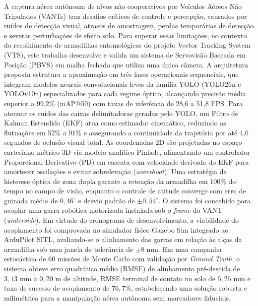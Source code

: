A captura aérea autônoma de alvos não cooperativos por Veículos Aéreos Não Tripulados (VANTs) traz desafios críticos de controle e percepção, causados por ruídos de detecção visual, atrasos de amostragem, perdas temporárias de detecção e severas perturbações de efeito solo. Para superar essas limitações, no contexto do recolhimento de armadilhas entomológicas do projeto Vector Tracking System (VTS), este trabalho desenvolve e valida um sistema de Servovisão Baseada em Posição (PBVS) em malha fechada que utiliza uma única câmera. A arquitetura proposta estrutura a aproximação em três fases operacionais sequenciais, que integram modelos neurais convolucionais leves da família YOLO (YOLO26n e YOLOv10n) especializados para cada regime óptico, alcançando precisão média superior a 99,2\% (mAP@50) com taxas de inferência de 28,6 a 51,8 FPS. Para atenuar os ruídos das caixas delimitadoras geradas pelo YOLO, um Filtro de Kalman Estendido (EKF) atua como estimador cinemático, reduzindo as flutuações em 52\% a 91\% e assegurando a continuidade da trajetória por até 4,0 segundos de oclusão visual total. As coordenadas 2D são projetadas no espaço cartesiano métrico 3D via modelo analítico Pinhole, alimentando um controlador Proporcional-Derivativo (PD) em cascata com velocidade derivada do EKF para amortecer oscilações e evitar sobrelevação (\textit{overshoot}). Uma estratégia de histerese óptica de zona dupla garante a retenção da armadilha em 100\% do tempo no campo de visão, enquanto o controle de atitude converge com erro de guinada médio de $0{,}46^\circ$ e desvio padrão de $\pm 0{,}54^\circ$. O sistema foi concebido para acoplar uma garra robótica motorizada instalada sob o \textit{frame} do VANT (\textit{underside}). Em virtude do cronograma de desenvolvimento, a viabilidade do acoplamento foi comprovada no simulador físico Gazebo Sim integrado ao ArduPilot SITL, avaliando-se o alinhamento das garras em relação às alças da armadilha sob uma janela de tolerância de $\pm 8\text{ mm}$. Em uma campanha estocástica de 60 missões de Monte Carlo com validação por \textit{Ground Truth}, o sistema obteve erro quadrático médio (RMSE) de alinhamento pré-descida de $3{,}13\text{ mm}$ a $0{,}20\text{ m}$ de altitude, RMSE terminal de contato no solo de $5{,}25\text{ mm}$ e taxa de sucesso de acoplamento de $76{,}7\%$, estabelecendo uma solução robusta e milimétrica para a manipulação aérea autônoma sem marcadores fiduciais.